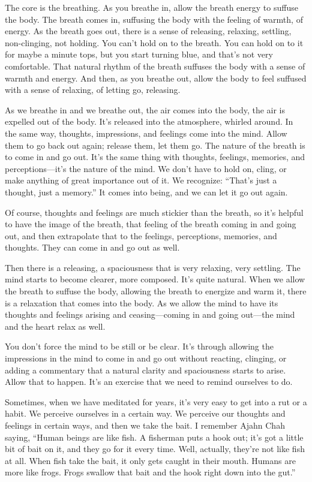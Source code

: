 The core is the breathing. As you breathe in, allow the breath energy to
suffuse the body. The breath comes in, suffusing the body with the
feeling of warmth, of energy. As the breath goes out, there is a sense
of releasing, relaxing, settling, non-clinging, not holding. You can’t
hold on to the breath. You can hold on to it for maybe a minute tops,
but you start turning blue, and that’s not very comfortable. That
natural rhythm of the breath suffuses the body with a sense of warmth
and energy. And then, as you breathe out, allow the body to feel
suffused with a sense of relaxing, of letting go, releasing.

As we breathe in and we breathe out, the air comes into the body, the
air is expelled out of the body. It’s released into the atmosphere,
whirled around. In the same way, thoughts, impressions, and feelings
come into the mind. Allow them to go back out again; release them, let
them go. The nature of the breath is to come in and go out. It’s the
same thing with thoughts, feelings, memories, and perceptions—it’s the
nature of the mind. We don’t have to hold on, cling, or make anything of
great importance out of it. We recognize: “That’s just a thought, just a
memory.” It comes into being, and we can let it go out again.

Of course, thoughts and feelings are much stickier than the breath, so
it’s helpful to have the image of the breath, that feeling of the breath
coming in and going out, and then extrapolate that to the feelings,
perceptions, memories, and thoughts. They can come in and go out as
well.

Then there is a releasing, a spaciousness that is very relaxing, very
settling. The mind starts to become clearer, more composed. It’s quite
natural. When we allow the breath to suffuse the body, allowing the
breath to energize and warm it, there is a relaxation that comes into
the body. As we allow the mind to have its thoughts and feelings arising
and ceasing—coming in and going out—the mind and the heart relax as
well.

You don’t force the mind to be still or be clear. It’s through allowing
the impressions in the mind to come in and go out without reacting,
clinging, or adding a commentary that a natural clarity and spaciousness
starts to arise. Allow that to happen. It’s an exercise that we need to
remind ourselves to do.

Sometimes, when we have meditated for years, it’s very easy to get into
a rut or a habit. We perceive ourselves in a certain way. We perceive
our thoughts and feelings in certain ways, and then we take the bait. I
remember Ajahn Chah saying, “Human beings are like fish. A fisherman
puts a hook out; it’s got a little bit of bait on it, and they go for it
every time. Well, actually, they’re not like fish at all. When fish take
the bait, it only gets caught in their mouth. Humans are more like
frogs. Frogs swallow that bait and the hook right down into the gut.”

